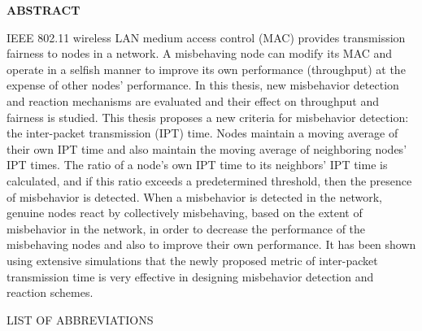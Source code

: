 \documentclass[12pt,letterpaper,english]{article}
\begin{document}
\begin{center}\textbf{ABSTRACT}\end{center}
\doublespacing
\hspace{0.5in}IEEE 802.11 wireless LAN medium access control (MAC) provides transmission fairness to nodes in a network. 
A misbehaving node can modify its MAC and operate in a selfish manner to improve its own performance (throughput) at the expense of other nodes' performance. 
In this thesis, new misbehavior detection and reaction mechanisms are evaluated and their effect on throughput and fairness is studied. 
This thesis proposes a new criteria for misbehavior detection: the inter-packet transmission (IPT) time.
Nodes maintain a moving average of their own IPT time and also maintain the moving average of neighboring nodes' IPT times. 
The ratio of a node's own IPT time to its neighbors' IPT time is calculated, and if this ratio exceeds a predetermined threshold, then the presence of misbehavior is detected. 
When a misbehavior is detected in the network, genuine nodes react by collectively misbehaving, based on the extent of misbehavior in the network, in order to decrease the performance of the misbehaving nodes and also to improve their own performance. 
It has been shown using extensive simulations that the newly proposed metric of inter-packet transmission time is very effective in designing misbehavior detection and reaction schemes.
\newpage
\singlespacing
\tableofcontents
\newpage
\listoftables
\newpage
\listoffigures
\newpage
\begin{center}LIST OF ABBREVIATIONS\end{center}
\end{document}
